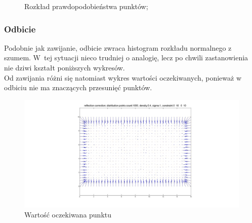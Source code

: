 \documentclass{mini}
\begin{document}
\begin{figure}[H]
\centering
{}
\quad
{}
\caption{Rozkład prawdopodobieństwa punktów;}
\end{figure}

\subsubsection*{Odbicie}
Podobnie jak zawijanie, odbicie zwraca histogram rozkładu normalnego z szumem. W~tej sytuacji nieco trudniej o analogię, lecz po chwili zastanowienia nie dziwi kształt poniższych wykresów.\\
Od zawijania różni się natomiast wykres wartości oczekiwanych, ponieważ w odbiciu nie ma znaczących przesunięć punktów.

\begin{figure}[H]
\centering
\includegraphics[width=\textwidth]{reflection2dprzesuniecie}
\caption{Wartość oczekiwana punktu}
\end{figure}
\end{document}
